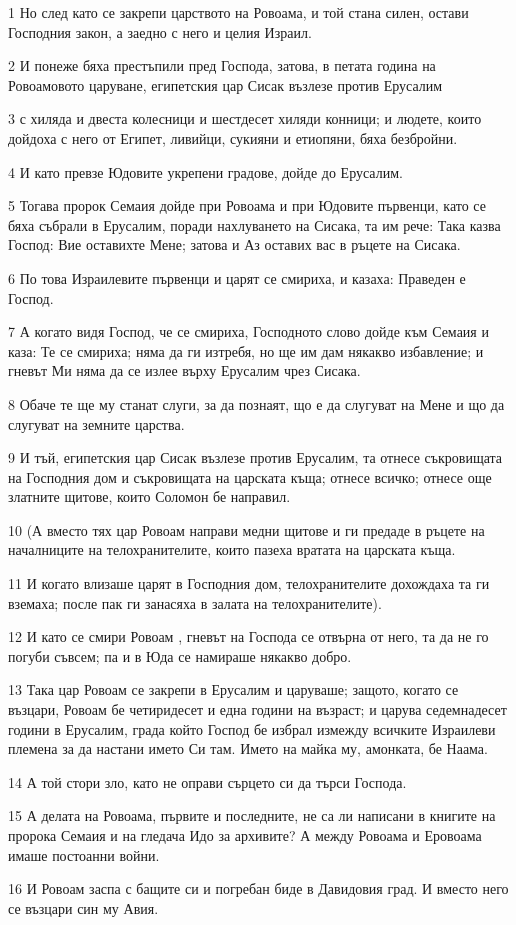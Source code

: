 \par 1 Но след като се закрепи царството на Ровоама, и той стана силен, остави Господния закон, а заедно с него и целия Израил.
\par 2 И понеже бяха престъпили пред Господа, затова, в петата година на Ровоамовото царуване, египетския цар Сисак възлезе против Ерусалим
\par 3 с хиляда и двеста колесници и шестдесет хиляди конници; и людете, които дойдоха с него от Египет, ливийци, сукияни и етиопяни, бяха безбройни.
\par 4 И като превзе Юдовите укрепени градове, дойде до Ерусалим.
\par 5 Тогава пророк Семаия дойде при Ровоама и при Юдовите първенци, като се бяха събрали в Ерусалим, поради нахлуването на Сисака, та им рече: Така казва Господ: Вие оставихте Мене; затова и Аз оставих вас в ръцете на Сисака.
\par 6 По това Израилевите първенци и царят се смириха, и казаха: Праведен е Господ.
\par 7 А когато видя Господ, че се смириха, Господното слово дойде към Семаия и каза: Те се смириха; няма да ги изтребя, но ще им дам някакво избавление; и гневът Ми няма да се излее върху Ерусалим чрез Сисака.
\par 8 Обаче те ще му станат слуги, за да познаят, що е да слугуват на Мене и що да слугуват на земните царства.
\par 9 И тъй, египетския цар Сисак възлезе против Ерусалим, та отнесе съкровищата на Господния дом и съкровищата на царската къща; отнесе всичко; отнесе още златните щитове, които Соломон бе направил.
\par 10 (А вместо тях цар Ровоам направи медни щитове и ги предаде в ръцете на началниците на телохранителите, които пазеха вратата на царската къща.
\par 11 И когато влизаше царят в Господния дом, телохранителите дохождаха та ги вземаха; после пак ги занасяха в залата на телохранителите).
\par 12 И като се смири Ровоам , гневът на Господа се отвърна от него, та да не го погуби съвсем; па и в Юда се намираше някакво добро.
\par 13 Така цар Ровоам се закрепи в Ерусалим и царуваше; защото, когато се възцари, Ровоам бе четиридесет и една години на възраст; и царува седемнадесет години в Ерусалим, града който Господ бе избрал измежду всичките Израилеви племена за да настани името Си там. Името на майка му, амонката, бе Наама.
\par 14 А той стори зло, като не оправи сърцето си да търси Господа.
\par 15 А делата на Ровоама, първите и последните, не са ли написани в книгите на пророка Семаия и на гледача Идо за архивите? А между Ровоама и Еровоама имаше постоанни войни.
\par 16 И Ровоам заспа с бащите си и погребан биде в Давидовия град. И вместо него се възцари син му Авия.


